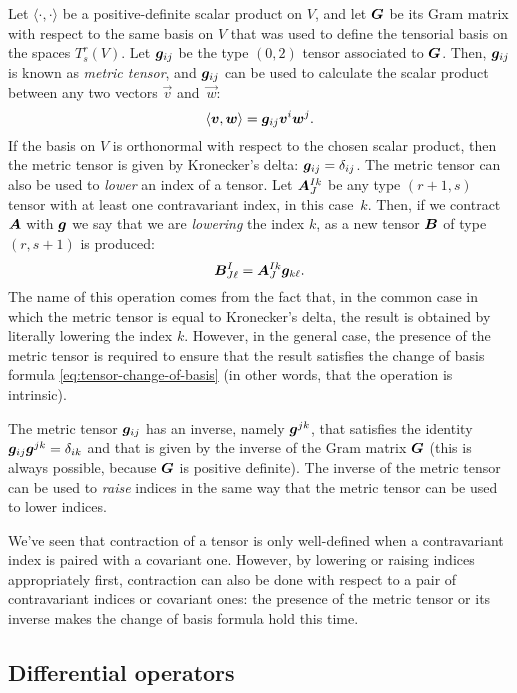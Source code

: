 Let $\langle \cdot, \cdot \rangle$ be a positive-definite scalar product
on $V$, and let $\bm{G}$ be its Gram matrix with respect to the same
basis on $V$ that was used to define the tensorial basis on the spaces $T^r_s(V)$.
Let $\bm{g}_{ij}$ be the type $(0,2)$ tensor associated to $\bm{G}$.
Then, $\bm{g}_{ij}$ is known as \emph{metric tensor}, and $\bm{g}_{ij}$
can be used to calculate the scalar product between any two vectors
$\vec{v}$ and~$\vec{w}$:
\[
\langle \bm{v}, \bm{w} \rangle = \bm{g}_{ij} \bm{v}^i \bm{w}^j.
\]
If the basis on $V$ is orthonormal with respect to the chosen scalar
product, then the metric tensor is given by Kronecker's delta:
$\bm{g}_{ij} = \delta_{ij}$. The metric tensor can also be used
to \emph{lower} an index of a tensor. Let $\bm{A}^{Ik}_J$ be
any type $(r+1,s)$ tensor with at least one contravariant index,
in this case~$k$. Then, if we contract $\bm{A}$ with $\bm{g}$ we
say that we are \emph{lowering} the index $k$, as a new tensor $\bm{B}$
of type $(r,s+1)$ is produced:
\[
\bm{B}^I_{J \ell} = \bm{A}^{Ik}_J \bm{g}_{k \ell}.
\]
The name of this operation comes from the fact that, in the common case in which
the metric tensor is equal to Kronecker's delta, the result is obtained by
literally lowering the index $k$. However, in the general case, the
presence of the metric tensor is required to ensure that the result
satisfies the change of basis formula \eqref{eq:tensor-change-of-basis}
(in other words, that the operation is intrinsic).

The metric tensor $\bm{g}_{ij}$ has an inverse, namely $\bm{g}^{jk}$,
that satisfies the identity $\bm{g}_{ij} \bm{g}^{jk} = \delta_{ik}$
and that is given by the inverse of the Gram matrix $\bm{G}$
(this is always possible, because $\bm{G}$ is positive definite).
The inverse of the metric tensor can be used to \emph{raise} indices
in the same way that the metric tensor can be used to lower indices.

We've seen that contraction of a tensor is only well-defined when
a contravariant index is paired with a covariant one.
However, by lowering or raising indices appropriately first, contraction
can also be done with respect to a pair of contravariant indices
or covariant ones: the presence of the metric tensor or its inverse
makes the change of basis formula hold this time.

\subsection*{Differential operators}

